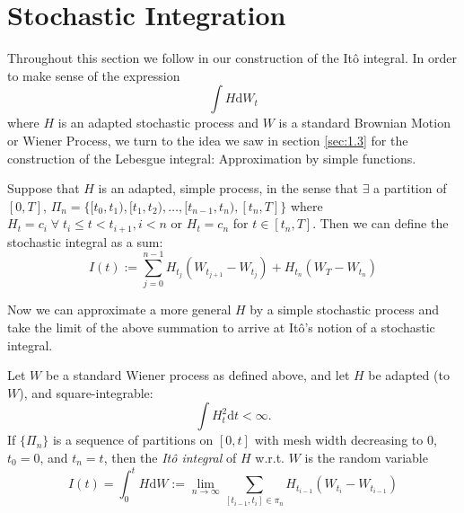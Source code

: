 \section{Stochastic Integration}\label{sec:1.5}

Throughout this section we follow \cite{SCfFII} in our construction of the It\^{o} 
integral. In order to make sense of the expression 
\begin{equation*}
    \int H\mathrm dW_t
\end{equation*}
where $H$ is an adapted stochastic process and $W$ is a standard Brownian Motion or 
Wiener Process, we turn to the idea we saw in section \ref{sec:1.3}
for the construction of the Lebesgue integral: Approximation by simple functions.

\begin{definition}
    Suppose that $H$ is an adapted, simple process, in the sense that $\exists$ a 
    partition of $[0,T]$, $\Pi_n=\{[t_0,t_1),[t_1,t_2),\dots,[t_{n-1},t_n),[t_n,T]\}$ where 
    $H_t=c_i\;\forall\;t_i\leq t<t_{i+1}, i < n$ or $H_t=c_n$ for $t\in[t_n,T]$.
    Then we can define the stochastic integral as a sum:
    \begin{equation}
        I(t):=\sum_{j=0}^{n-1}H_{t_j}(W_{t_{j+1}}-W_{t_j})+H_{t_n}(W_T-W_{t_n})
    \end{equation}     
\end{definition}

Now we can approximate a more general $H$ by a simple stochastic process and 
take the limit of the above summation to arrive at It\^{o}'s notion of a stochastic 
integral.

\begin{definition}
    Let $W$ be a standard Wiener process as defined above, and let $H$ be adapted 
    (to $W$), and square-integrable:
    \begin{equation*}
        \int H_t^2\mathrm dt<\infty.
    \end{equation*}
    If $\{\Pi_n\}$ is a sequence of partitions on $[0,t]$ with mesh width decreasing
    to $0$, $t_0=0$, and $t_n=t$, then the \emph{It\^{o} integral} of $H$
    w.r.t. $W$ is the random variable
    \begin{equation}
        I(t)=\int_0^tH\mathrm dW:=\lim_{n\rightarrow\infty}\sum_{[t_{i-1},t_i]\in\pi_n}H_{t_{i-1}}(W_{t_i}-W_{t_{i-1}})
    \end{equation}
\end{definition}

